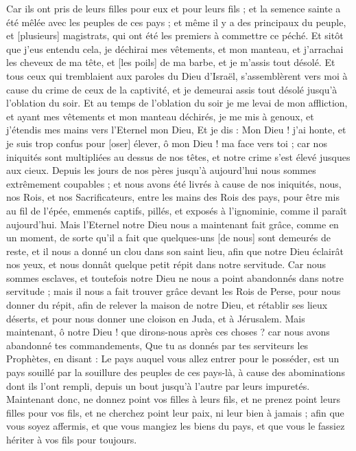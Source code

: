 \begin{multicols}{2}
Car ils ont pris de leurs filles pour eux et pour leurs fils ; et la semence sainte a été mêlée avec les peuples de ces pays ; et même il y a des principaux du peuple, et [plusieurs] magistrats, qui ont été les premiers à commettre ce péché.
Et sitôt que j'eus entendu cela, je déchirai mes vêtements, et mon manteau, et j'arrachai les cheveux de ma tête, et [les poils] de ma barbe, et je m'assis tout désolé.
Et tous ceux qui tremblaient aux paroles du Dieu d'Israël, s'assemblèrent vers moi à cause du crime de ceux de la captivité, et je demeurai assis tout désolé jusqu'à l'oblation du soir.
Et au temps de l'oblation du soir je me levai de mon affliction, et ayant mes vêtements et mon manteau déchirés, je me mis à genoux, et j'étendis mes mains vers l'Eternel mon Dieu,
Et je dis : Mon Dieu ! j'ai honte, et je suis trop confus pour [oser] élever, ô mon Dieu ! ma face vers toi ; car nos iniquités sont multipliées au dessus de nos têtes, et notre crime s'est élevé jusques aux cieux.
Depuis les jours de nos pères jusqu'à aujourd'hui nous sommes extrêmement coupables ; et nous avons été livrés à cause de nos iniquités, nous, nos Rois, et nos Sacrificateurs, entre les mains des Rois des pays, pour être mis au fil de l'épée, emmenés captifs, pillés, et exposés à l'ignominie, comme il paraît aujourd'hui.
Mais l'Eternel notre Dieu nous a maintenant fait grâce, comme en un moment, de sorte qu'il a fait que quelques-uns [de nous] sont demeurés de reste, et il nous a donné un clou dans son saint lieu, afin que notre Dieu éclairât nos yeux, et nous donnât quelque petit répit dans notre servitude.
Car nous sommes esclaves, et toutefois notre Dieu ne nous a point abandonnés dans notre servitude ; mais il nous a fait trouver grâce devant les Rois de Perse, pour nous donner du répit, afin de relever la maison de notre Dieu, et rétablir ses lieux déserts, et pour nous donner une cloison en Juda, et à Jérusalem.
Mais maintenant, ô notre Dieu ! que dirons-nous après ces choses ? car nous avons abandonné tes commandements,
Que tu as donnés par tes serviteurs les Prophètes, en disant : Le pays auquel vous allez entrer pour le posséder, est un pays souillé par la souillure des peuples de ces pays-là, à cause des abominations dont ils l'ont rempli, depuis un bout jusqu'à l'autre par leurs impuretés.
Maintenant donc, ne donnez point vos filles à leurs fils, et ne prenez point leurs filles pour vos fils, et ne cherchez point leur paix, ni leur bien à jamais ; afin que vous soyez affermis, et que vous mangiez les biens du pays, et que vous le fassiez hériter à vos fils pour toujours.

\end{multicols}

